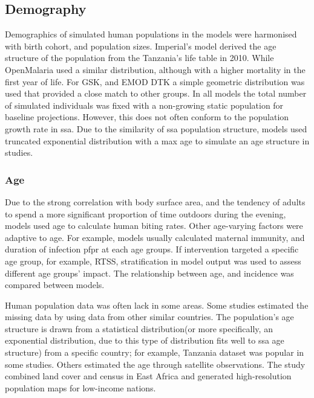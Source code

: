 \documentclass[a4paper, 12pt, twoside]{article}
\begin{document}
\subsection{Demography}
Demographics of simulated human populations in the models were harmonised with birth cohort, and population sizes.
Imperial's model derived the age structure of the population from the Tanzania's life table in 2010.
While OpenMalaria used a similar distribution, although with a higher mortality in the first year of life.
For GSK, and EMOD DTK a simple geometric distribution was used that provided a close match to other groups.
In all models the total number of simulated individuals was fixed with a non-growing static population for baseline projections.
However, this does not often conform to the population growth rate in \gls{ssa}.
Due to the similarity of \gls{ssa} population structure, models used truncated exponential distribution with a max age to simulate an age structure in studies\cite{White2018b}.

\subsubsection{Age}
Due to the strong correlation with body surface area, and the tendency of adults to spend a more significant proportion of time outdoors during the evening, models used age to calculate human biting rates.
Other age-varying factors were adaptive to age.
For example, models usually calculated maternal immunity, and duration of infection \gls{pfpr} at each age groups.
If intervention targeted a specific age group, for example, RTSS, stratification in model output was used to assess different age groups' impact.
The relationship between age, and incidence was compared between models.

Human population data was often lack in some areas.
Some studies estimated the missing data by using data from other similar countries.
The population's age structure is drawn from a statistical distribution(or more specifically, an exponential distribution, due to this type of distribution fits well to \gls{ssa} age structure) from a specific country; for example, Tanzania dataset\cite{Sherrard-Smith2018b} was popular in some studies.
Others\cite{Adimi2010} estimated the age through satellite observations.
The study combined land cover and census in East Africa and generated high-resolution population maps for low-income nations.
\end{document}
